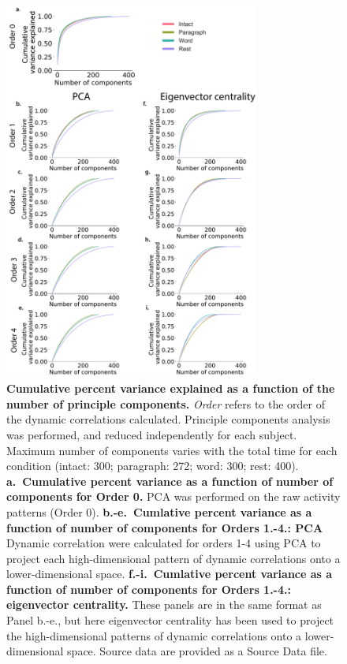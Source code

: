 \documentclass[english]{article}
\begin{document}
\begin{figure}[p!]
\centering
\includegraphics[width=0.75\textwidth]{figs/pca}
\caption{\textbf{Cumulative percent variance explained as a function
    of the number of principle components.}  \textit{Order} refers to the order of the dynamic
    correlations calculated. Principle components analysis was
    performed, and reduced independently for each subject.  Maximum number of components varies with
    the total time for each condition (intact: 300; paragraph: 272;
    word: 300; rest: 400). \textbf{a.~Cumulative percent
    variance as a function of number of components for Order 0.} PCA
  was performed on the raw activity patterns (Order 0). \textbf{b.-e.~Cumlative percent
    variance as a function of number of components for Orders 1.-4.:
    PCA} Dynamic correlation were calculated for orders 1-4 using PCA to
    project each high-dimensional pattern of dynamic correlations onto
    a lower-dimensional space.   \textbf{f.-i.~Cumlative percent
    variance as a function of number of components for Orders 1.-4.: eigenvector centrality.} These panels are in the
    same format as Panel b.-e., but here eigenvector centrality has been
    used to project the high-dimensional patterns of dynamic
    correlations onto a lower-dimensional space. Source data are provided as a Source Data file.}
\label{fig:pca}
\end{figure}





\newpage
\renewcommand{\refname}{Supplementary references}


\end{document}
